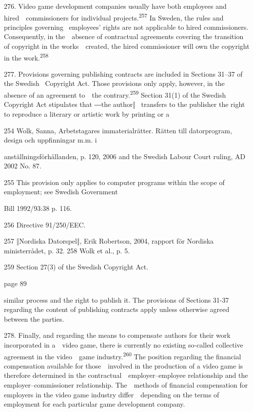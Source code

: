 \documentclass[
]{article}
\begin{document}
{276. }{Video game development companies usually have both employees and
hired~~commissioners for individual projects.}\textsuperscript{{257
}}{In Sweden, the rules and principles governing }{~employees' rights
are not applicable to hired commissioners}{. Consequently, in
the~~absence of contractual agreements covering the transition of
copyright in the works~~created, the hired commissioner will own the
copyright in the work.}\textsuperscript{{258}}

{277. }{Provisions governing publishing contracts are included in
Sections 31}{--}{37 of the Swedish }{~Copyright Act}{. Those provisions
only apply, however, in the absence of an agreement to~~the
contrary.}\textsuperscript{{259 }}{Section 31(1) of the Swedish
}{Copyright Act }{stipulates that ―the author‖ }{~transfers to the
publisher the right to reproduce a literary or artistic work by printing
or a}

{254 }{Wolk, Sanna, Arbetstagares immaterialrätter. Rätten till
datorprogram, design och uppfinningar m.m. i}

{anställningsförhållanden, p. 120, 2006 and the Swedish Labour Court
ruling, AD 2002 No. 87.}

{255 }{This provision only applies to computer programs within the scope
of employment; see Swedish Government}

{Bill 1992/93:38 p. 116.}

{256 }{Directive 91/250/EEC.}

{257 }{‖}{Nordiska Datorspel}{‖}{, Erik Robertson, 2004, rapport för
Nordiska ministerrådet, p. 32. }{258 }{Wolk }{et al}{., p. 5.}

{259 }{Section 27(3) of the Swedish }{Copyright Act.}

{page 89}

{similar process and the right to publish it. The provisions of Sections
31-37 regarding the content of publishing contracts apply unless
otherwise agreed between the parties.}

{278. }{Finally, and regarding the means to compensate authors for their
work incorporated in a~~video game, there is currently no existing
so-called collective agreement in the video~~game
industry.}\textsuperscript{{260 }}{The position regarding the financial
compensation available for those~~involved in the production of a video
game is therefore determined in the contractual~~employer}{--}{employee
relationship and the employer}{--}{commissioner relationship.
The~~methods of financial compensation for employers in the video game
industry differ~~depending on the terms of employment for each
particular game development company.}
\end{document}

